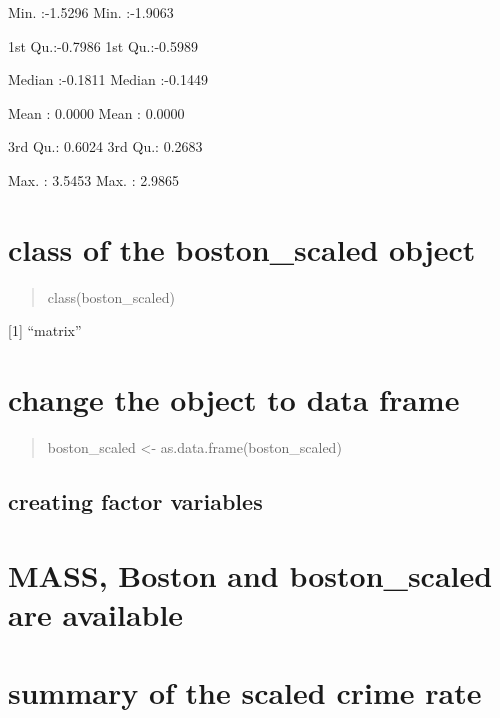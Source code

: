 \documentclass[]{article}
\begin{document}
Min. :-1.5296 Min. :-1.9063

1st Qu.:-0.7986 1st Qu.:-0.5989

Median :-0.1811 Median :-0.1449

Mean : 0.0000 Mean : 0.0000

3rd Qu.: 0.6024 3rd Qu.: 0.2683

Max. : 3.5453 Max. : 2.9865

\begin{quote}
\end{quote}

\section{class of the boston\_scaled
object}\label{class-of-the-boston_scaled-object-1}

\begin{quote}
class(boston\_scaled)
\end{quote}

{[}1{]} ``matrix''

\begin{quote}
\end{quote}

\section{change the object to data
frame}\label{change-the-object-to-data-frame-1}

\begin{quote}
boston\_scaled \textless{}- as.data.frame(boston\_scaled)
\end{quote}

\begin{quote}
\end{quote}

\subsection{creating factor variables}\label{creating-factor-variables}

\section{MASS, Boston and boston\_scaled are
available}\label{mass-boston-and-boston_scaled-are-available}

\section{summary of the scaled crime
rate}\label{summary-of-the-scaled-crime-rate}
\end{document}
